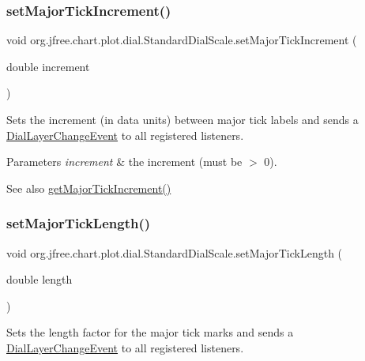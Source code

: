 \subsubsection{\texorpdfstring{set\+Major\+Tick\+Increment()}{setMajorTickIncrement()}}
{\footnotesize\ttfamily void org.\+jfree.\+chart.\+plot.\+dial.\+Standard\+Dial\+Scale.\+set\+Major\+Tick\+Increment (\begin{DoxyParamCaption}\item[{double}]{increment }\end{DoxyParamCaption})}

Sets the increment (in data units) between major tick labels and sends a \mbox{\hyperlink{classorg_1_1jfree_1_1chart_1_1plot_1_1dial_1_1_dial_layer_change_event}{Dial\+Layer\+Change\+Event}} to all registered listeners.


\begin{DoxyParams}{Parameters}
{\em increment} & the increment (must be $>$ 0).\\
\hline
\end{DoxyParams}
\begin{DoxySeeAlso}{See also}
\mbox{\hyperlink{classorg_1_1jfree_1_1chart_1_1plot_1_1dial_1_1_standard_dial_scale_afbf15ccabd854f33f1a6b2601c358352}{get\+Major\+Tick\+Increment()}} 
\end{DoxySeeAlso}
\mbox{\label{classorg_1_1jfree_1_1chart_1_1plot_1_1dial_1_1_standard_dial_scale_a3531e89f783571d0c9c07911e88aea6e}} 
\subsubsection{\texorpdfstring{set\+Major\+Tick\+Length()}{setMajorTickLength()}}
{\footnotesize\ttfamily void org.\+jfree.\+chart.\+plot.\+dial.\+Standard\+Dial\+Scale.\+set\+Major\+Tick\+Length (\begin{DoxyParamCaption}\item[{double}]{length }\end{DoxyParamCaption})}

Sets the length factor for the major tick marks and sends a \mbox{\hyperlink{classorg_1_1jfree_1_1chart_1_1plot_1_1dial_1_1_dial_layer_change_event}{Dial\+Layer\+Change\+Event}} to all registered listeners.


